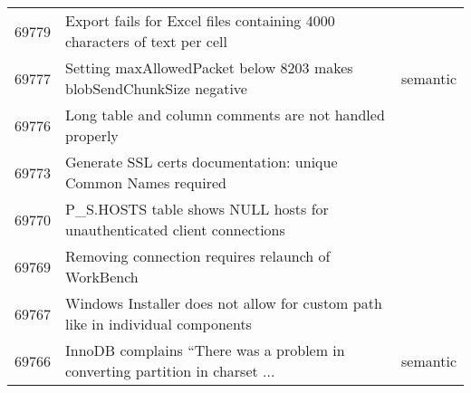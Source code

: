 \begin{longtable}[c]{p{1cm}p{8cm}p{3cm}}
69779 & Export fails for Excel files containing  4000 characters of text per cell &  \\
69777 & Setting maxAllowedPacket below 8203 makes blobSendChunkSize negative & semantic \\
69776 & Long table and column comments are not handled properly &  \\
69773 & Generate SSL certs documentation: unique Common Names required &  \\
69770 & P\_S.HOSTS table shows NULL hosts for unauthenticated client connections &  \\
69769 & Removing connection requires relaunch of WorkBench &  \\
69767 & Windows Installer does not allow for custom path like in individual components &  \\
69766 & InnoDB complains ``There was a problem in converting partition in charset ... & semantic
\end{longtable}